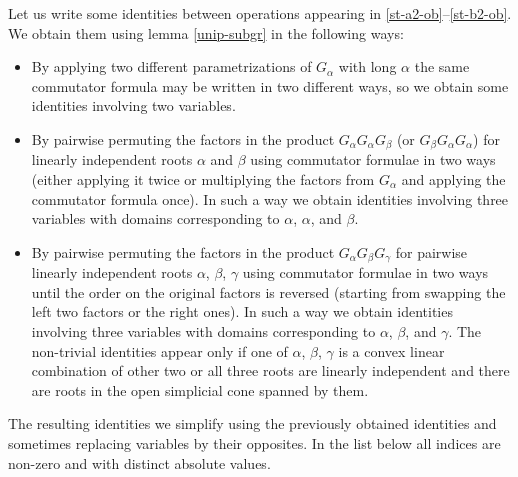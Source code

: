 \documentclass{article}
\theoremstyle{definition}
\begin{document}
Let us write some identities between operations appearing in \ref{st-a2-ob}--\ref{st-b2-ob}. We obtain them using lemma \ref{unip-subgr} in the following ways:
\begin{itemize}
    \item By applying two different parametrizations of \(G_\alpha\) with long \(\alpha\) the same commutator formula may be written in two different ways, so we obtain some identities involving two variables.
    \item By pairwise permuting the factors in the product \(
        G_\alpha G_\alpha G_\beta
    \) (or \(
        G_\beta G_\alpha G_\alpha
    \)) for linearly independent roots \(\alpha\) and \(\beta\) using commutator formulae in two ways (either applying it twice or multiplying the factors from \(G_\alpha\) and applying the commutator formula once). In such a way we obtain identities involving three variables with domains corresponding to \(\alpha\), \(\alpha\), and \(\beta\).
    \item By pairwise permuting the factors in the product \(
        G_\alpha G_\beta G_\gamma
    \) for pairwise linearly independent roots \(\alpha\), \(\beta\), \(\gamma\) using commutator formulae in two ways until the order on the original factors is reversed (starting from swapping the left two factors or the right ones). In such a way we obtain identities involving three variables with domains corresponding to \(\alpha\), \(\beta\), and \(\gamma\). The non-trivial identities appear only if one of \(\alpha\), \(\beta\), \(\gamma\) is a convex linear combination of other two or all three roots are linearly independent and there are roots in the open simplicial cone spanned by them.
\end{itemize}
The resulting identities we simplify using the previously obtained identities and sometimes replacing variables by their opposites. In the list below all indices are non-zero and with distinct absolute values.
\end{document}
